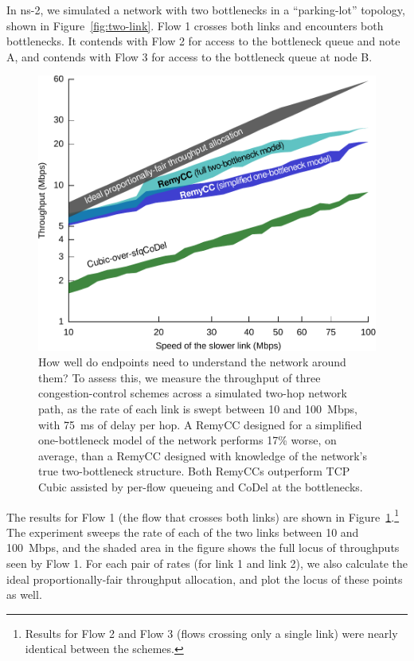 In ns-2, we simulated a network with two bottlenecks in a
``parking-lot'' topology, shown in Figure~\ref{fig:two-link}. Flow 1
crosses both links and encounters both bottlenecks. It contends with
Flow 2 for access to the bottleneck queue and note A, and contends
with Flow 3 for access to the bottleneck queue at node B.

\begin{figure}[t!]
\caption{How well do endpoints need to understand the network around
  them? To assess this, we measure the throughput of three
  congestion-control schemes across a simulated two-hop network path,
  as the rate of each link is swept between 10 and 100~Mbps, with
  75~ms of delay per hop. A RemyCC designed for a simplified
  one-bottleneck model of the network performs 17\% worse, on average,
  than a RemyCC designed with knowledge of the network's true
  two-bottleneck structure. Both RemyCCs outperform TCP Cubic assisted
  by per-flow queueing and CoDel at the bottlenecks.}
\label{f:multihop}
\begin{center}
\includegraphics[width=\columnwidth]{multilink-all.pdf}
\end{center}
\end{figure}

The results for Flow 1 (the flow that crosses both links) are shown in
Figure~\ref{f:multihop}.\footnote{Results for Flow 2 and Flow 3
  (flows crossing only a single link) were nearly identical between
  the schemes.} The experiment sweeps the rate of each of the two
links between 10 and 100~Mbps, and the shaded area in the figure shows
the full locus of throughputs seen by Flow 1. For each pair of rates
(for link 1 and link 2), we also calculate the ideal
proportionally-fair throughput allocation, and plot the locus of these
points as well.

